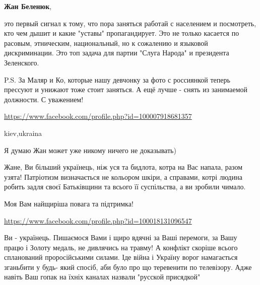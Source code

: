 \begin{itemize}

\textbf{Жан Беленюк}, 

это первый сигнал к тому, что пора заняться работай с населением и посмотреть,
кто чем дышит и какие "уставы" пропагандирует. Это не только касается по
расовым, этническим, национальный, но к сожалению и языковой дискриминации. Это
топ задача для партии "Слуга Народа" и президента Зеленского.

P.S. За Маляр и Ко, которые нашу девчонку за фото с россиянкой теперь прессуют
и унижают тоже стоит заняться. А ещё лучше - снять из занимаемой должности. С
уважением!

\url{https://www.facebook.com/profile.php?id=100007918681357}\par
kiev,ukraina
 
Я думаю Жан может уже никому ничего не доказывать)


Жане, Ви більший українець, ніж уся та бидлота, котра на Вас напала, разом
узята! Патріотизм визначається не кольором шкіри, а справами, котрі людина
робить задля своєї Батьківщини та всього її суспільства, а ви зробили чимало.

Моя Вам найщиріша повага та підтримка!

\url{https://www.facebook.com/profile.php?id=100018131096547}\par
 

Ви - українець. Пишаємося Вами і щиро вдячні за Ваші перемоги, за Вашу працю і
Золоту медаль, не дивлячись на травму! А конфлікт скоріше всього спланований
проросійськими силами. Іде війна і Україну ворог намагається зганьбити у будь-
який спосіб, аби було про що теревенити по телевізору. Адже навіть Ваш гопак на
їхніх каналах назвали "русской присядкой"



\end{itemize}
